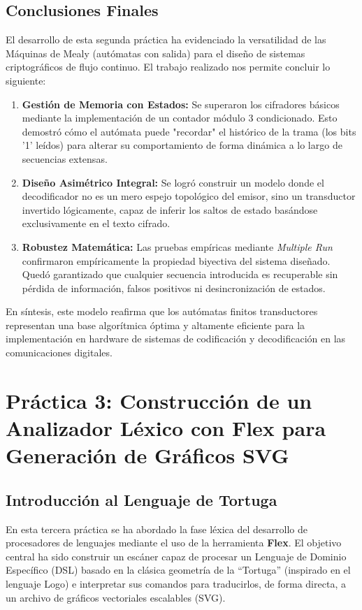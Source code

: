 \documentclass[12pt,a4paper]{article}
\begin{document}
\subsection{Conclusiones Finales}
El desarrollo de esta segunda práctica ha evidenciado la versatilidad de las Máquinas de Mealy (autómatas con salida) para el diseño de sistemas criptográficos de flujo continuo. El trabajo realizado nos permite concluir lo siguiente:
\begin{enumerate}
    \item \textbf{Gestión de Memoria con Estados:} Se superaron los cifradores básicos mediante la implementación de un contador módulo 3 condicionado. Esto demostró cómo el autómata puede "recordar" el histórico de la trama (los bits '1' leídos) para alterar su comportamiento de forma dinámica a lo largo de secuencias extensas.
    \item \textbf{Diseño Asimétrico Integral:} Se logró construir un modelo donde el decodificador no es un mero espejo topológico del emisor, sino un transductor invertido lógicamente, capaz de inferir los saltos de estado basándose exclusivamente en el texto cifrado.
    \item \textbf{Robustez Matemática:} Las pruebas empíricas mediante \textit{Multiple Run} confirmaron empíricamente la propiedad biyectiva del sistema diseñado. Quedó garantizado que cualquier secuencia introducida es recuperable sin pérdida de información, falsos positivos ni desincronización de estados.
\end{enumerate}
En síntesis, este modelo reafirma que los autómatas finitos transductores representan una base algorítmica óptima y altamente eficiente para la implementación en hardware de sistemas de codificación y decodificación en las comunicaciones digitales.

\newpage

\section{Práctica 3: Construcción de un Analizador Léxico con Flex para \mbox{Generación} de Gráficos SVG}

\subsection{Introducción al Lenguaje de Tortuga}
En esta tercera práctica se ha abordado la fase léxica del desarrollo de procesadores de lenguajes mediante el uso de la herramienta \textbf{Flex}. El objetivo central ha sido construir un escáner capaz de procesar un Lenguaje de Dominio Específico (DSL) basado en la clásica geometría de la ``Tortuga'' (inspirado en el lenguaje Logo) e interpretar sus comandos para traducirlos, de forma directa, a un archivo de gráficos vectoriales escalables (SVG).
\end{document}
